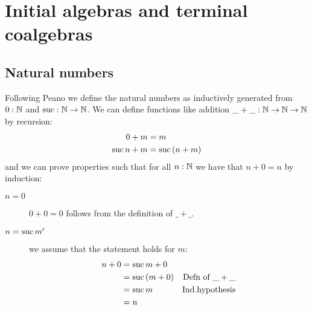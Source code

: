 \section{Initial algebras and terminal coalgebras}
\label{sec:init-algebr-term}

\subsection{Natural numbers}
\label{sec:natural-numbers}

Following Peano we define the natural numbers as inductively generated from $0:\mathbb{N}$ and $\mathrm{suc} : \mathbb{N} \to \mathbb{N}$. We can define functions like addition
$\_+\_ : \mathbb{N} \to \mathbb{N} \to \mathbb{N}$ by recursion:
\begin{align*}
  0 + m & = m\\
  \mathrm{suc}\,n + m & = \mathrm{suc}\,(n + m)
\end{align*}
and we can prove properties such that for all $n : \mathbb{N}$ we have that $n + 0 = n$ by induction:
\begin{description}
\item[$n=0$] $0 + 0 = 0$ follows from the definition of $\_+\_$.
\item[$n = \mathrm{suc}\,m'$] we assume that the statement holds for $m$:
  \begin{align*}
    n + 0 
    & = \mathrm{suc}\,m + 0 \\
    & = \mathrm{suc}\,(m + 0) & \mbox{Defn of $\_+\_$}\\
    & = \mathrm{suc}\,m & \mbox{Ind.hypothesis} \\
    & = n
  \end{align*}
\end{description}

